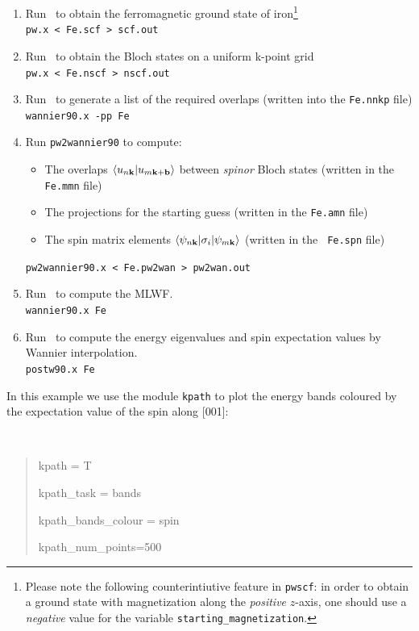 \documentclass[a4paper,11pt,twoside]{article}
\begin{document}
\begin{enumerate}
\item Run \pwscf\ to obtain the ferromagnetic ground state of
  iron\footnote{Please note the following counterintiutive feature in
    {\tt pwscf}: in order to obtain a ground state with magnetization
    along the {\it positive} $z$-axis, one should use a {\it negative}
    value for the variable {\tt starting\_magnetization}.}\\
  {\tt pw.x < Fe.scf > scf.out}

\item Run \pwscf\ to obtain the Bloch states on a uniform k-point
  grid\\ 
{\tt pw.x < Fe.nscf > nscf.out}

\item Run \wannier\ to generate a list of the required overlaps (written
  into the {\tt Fe.nnkp} file)\\
{\tt wannier90.x -pp Fe}

\item Run {\tt pw2wannier90} to compute:
  \begin{itemize}
  \item{The overlaps $\langle u_{n{\bf k}}\vert u_{m{\bf k}+{\bf
          b}}\rangle$ between {\it spinor} Bloch states (written in the {\tt
        Fe.mmn} file)}
    \item{The projections for the starting guess (written in the {\tt  Fe.amn} file)}
    \item{The spin matrix elements $\langle \psi_{n{\bf k}}\vert
        \sigma_i\vert \psi_{m{\bf k}}\rangle$ (written in the {\tt
          Fe.spn} file)}
  \end{itemize}
{\tt pw2wannier90.x < Fe.pw2wan > pw2wan.out}

\item Run \wannier\ to compute the MLWF.\\
{\tt wannier90.x Fe}

\item Run \postw\ to compute the energy eigenvalues and spin
  expectation values
  by Wannier interpolation.\\
  {\tt postw90.x Fe}

\end{enumerate}

 In this example we use the module {\tt kpath} to plot the energy
  bands coloured by the expectation value of the spin along [001]:
  {\tt
\begin{quote}
kpath = T

kpath\_task = bands

kpath\_bands\_colour = spin     

kpath\_num\_points=500
\end{quote} }
\end{document}
